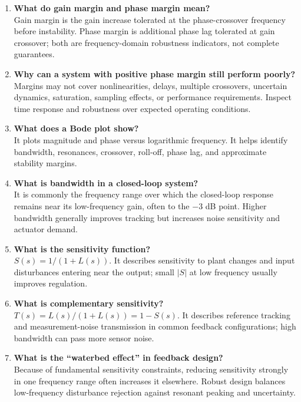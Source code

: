 \documentclass[11pt]{article}
\begin{document}
\begin{enumerate}
\item \textbf{What do gain margin and phase margin mean?}\\
Gain margin is the gain increase tolerated at the phase-crossover frequency before instability. Phase margin is additional phase lag tolerated at gain crossover; both are frequency-domain robustness indicators, not complete guarantees.

\item \textbf{Why can a system with positive phase margin still perform poorly?}\\
Margins may not cover nonlinearities, delays, multiple crossovers, uncertain dynamics, saturation, sampling effects, or performance requirements. Inspect time response and robustness over expected operating conditions.

\item \textbf{What does a Bode plot show?}\\
It plots magnitude and phase versus logarithmic frequency. It helps identify bandwidth, resonances, crossover, roll-off, phase lag, and approximate stability margins.

\item \textbf{What is bandwidth in a closed-loop system?}\\
It is commonly the frequency range over which the closed-loop response remains near its low-frequency gain, often to the $-3$ dB point. Higher bandwidth generally improves tracking but increases noise sensitivity and actuator demand.

\item \textbf{What is the sensitivity function?}\\
$S(s)=1/(1+L(s))$. It describes sensitivity to plant changes and input disturbances entering near the output; small $|S|$ at low frequency usually improves regulation.

\item \textbf{What is complementary sensitivity?}\\
$T(s)=L(s)/(1+L(s))=1-S(s)$. It describes reference tracking and measurement-noise transmission in common feedback configurations; high bandwidth can pass more sensor noise.

\item \textbf{What is the ``waterbed effect'' in feedback design?}\\
Because of fundamental sensitivity constraints, reducing sensitivity strongly in one frequency range often increases it elsewhere. Robust design balances low-frequency disturbance rejection against resonant peaking and uncertainty.


\end{enumerate}
\end{document}
